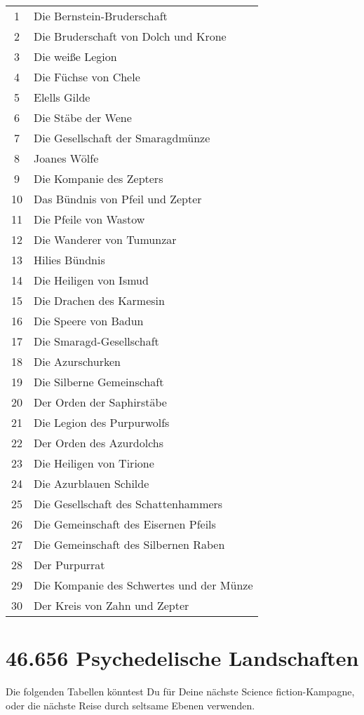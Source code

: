 \begin{tabularx}{\columnwidth}{cZ}
1 & Die Bernstein-Bruderschaft\\
2 & Die Bruderschaft von Dolch und Krone\\
3 & Die weiße Legion\\
4 & Die Füchse von Chele\\
5 & Elells Gilde\\
6 & Die Stäbe der Wene\\
7 & Die Gesellschaft der Smaragdmünze\\
8 & Joanes Wölfe\\
9 & Die Kompanie des Zepters\\
10 & Das Bündnis von Pfeil und Zepter\\
11 & Die Pfeile von Wastow\\
12 & Die Wanderer von Tumunzar\\
13 & Hilies Bündnis\\
14 & Die Heiligen von Ismud\\
15 & Die Drachen des Karmesin\\
16 & Die Speere von Badun\\
17 & Die Smaragd-Gesellschaft\\
18 & Die Azurschurken\\
19 & Die Silberne Gemeinschaft\\
20 & Der Orden der Saphirstäbe\\
21 & Die Legion des Purpurwolfs\\
22 & Der Orden des Azurdolchs\\
23 & Die Heiligen von Tirione\\
24 & Die Azurblauen Schilde\\
25 & Die Gesellschaft des Schattenhammers\\
26 & Die Gemeinschaft des Eisernen Pfeils\\
27 & Die Gemeinschaft des Silbernen Raben\\
28 & Der Purpurrat\\
29 & Die Kompanie des Schwertes und der Münze\\
30 & Der Kreis von Zahn und Zepter\\
\end{tabularx}

\section{46.656 Psychedelische Landschaften}

Die folgenden Tabellen könntest Du für Deine nächste Science
fiction-Kampagne, oder die nächste Reise durch seltsame Ebenen
verwenden.


